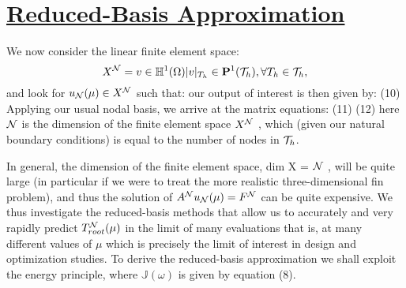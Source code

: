 \chapter[Reduced-Basis Approximation]{\uline{Reduced-Basis Approximation}}
We now consider the linear finite element space:
$$X^{\cal N} = {v \in \mathbb{H}^1(\Omega) |v|_{T_h } \in \mathbf{P}^1({\cal T}_h ), \forall T_h \in {\cal T}_h },$$
and look for $u_{\cal N} (\mu) \in X^{\cal N}$ such that:
our output of interest is then given by:
 {(10)}
Applying our usual nodal basis, we arrive at the matrix equations:
 {(11)}
 {(12)}
here ${\cal N}$ is the dimension of the finite element space $X^{\cal N}$ , which (given our natural boundary conditions) is equal to the number of nodes in ${\cal T}_h $.

In general, the dimension of the finite element space, dim X = ${\cal N}$  , will be quite large (in particular if we were to treat the more realistic three-dimensional fin
problem), and thus the solution of $A^{\cal N} u_{\cal N} (\mu) = F^{\cal N}$ can be quite expensive. We thus investigate the reduced-basis methods that allow us to accurately and
very rapidly predict $T_{root}^{\cal N} (\mu)$ in the limit of many evaluations that is, at many different values of $\mu$ which is precisely the limit of interest in design and optimization studies. To derive the reduced-basis approximation we shall exploit the energy principle,
where $\mathbb {J}(\omega)$ is given by equation (8).

